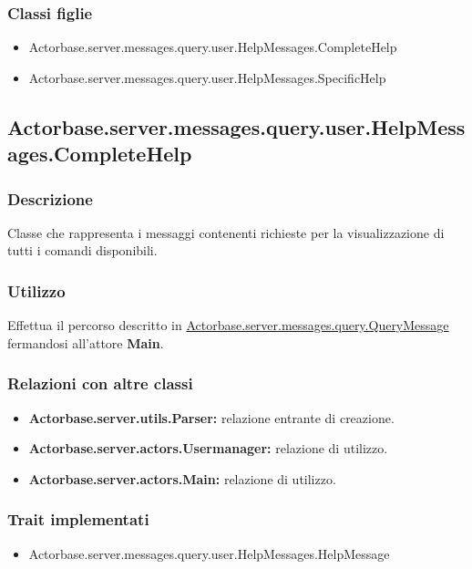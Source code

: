 \documentclass[a4paper]{article}
\begin{document}
			\subsubsection{Classi figlie}
				\begin{itemize}
					\item Actorbase.server.messages.query.user.HelpMessages.CompleteHelp
					\item Actorbase.server.messages.query.user.HelpMessages.SpecificHelp
				\end{itemize}
		
		\subsection{Actorbase.server.messages.query.user.HelpMessages.CompleteHelp}
			\subsubsection{Descrizione}
				Classe che rappresenta i messaggi contenenti richieste per la visualizzazione di tutti i comandi disponibili.
				
			\subsubsection{Utilizzo}
				Effettua il percorso descritto in \hyperref[QueryMessage]{Actorbase.server.messages.query.QueryMessage} fermandosi all'attore \textbf{Main}.
				
			\subsubsection{Relazioni con altre classi}
				\begin{itemize}
					\item \textbf{Actorbase.server.utils.Parser:} relazione entrante di creazione.
					\item \textbf{Actorbase.server.actors.Usermanager:} relazione di utilizzo.
					\item \textbf{Actorbase.server.actors.Main:} relazione di utilizzo.
				\end{itemize}
			\subsubsection{Trait implementati}
				\begin{itemize}
					\item Actorbase.server.messages.query.user.HelpMessages.HelpMessage
				\end{itemize}
\end{document}
